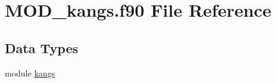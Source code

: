 \hypertarget{MOD__kangs_8f90}{\section{M\-O\-D\-\_\-kangs.\-f90 File Reference}
\label{MOD__kangs_8f90}
}
\subsection*{Data Types}
\begin{DoxyCompactItemize}
\item 
module \hyperlink{classkangs}{kangs}
\end{DoxyCompactItemize}
